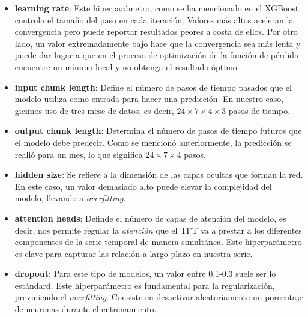 \begin{itemize}
    \item \textbf{learning rate}: Este hiperparámetro, como se ha mencionado en el XGBoost, controla el tamaño del paso en cada iteración. Valores más altos aceleran la convergencia pero puede reportar resultados peores a costa de ellos. Por otro lado, un valor extremadamente bajo hace que la convergencia sea más lenta y puede dar lugar a que en el proceso de optimización de la función de pérdida encuentre un mínimo local y no obtenga el resultado óptimo.
    
    \item \textbf{input chunk length}: Define el número de pasos de tiempo pasados que el modelo utiliza como entrada para hacer una predicción. En nuestro caso, gicimos uso de tres mese de datos, es decir, $24 \times 7 \times 4 \times 3$ pasos de tiempo.
    \item \textbf{output chunk length}: Determina el número de pasos de tiempo futuros que el modelo debe predecir. Como se mencionó anteriormente, la predicción se realió para un mes, lo que significa $24 \times 7 \times 4$ pasos.
     
    \item \textbf{hidden size}: Se refiere a la dimensión de las capas ocultas que forman la red. En este caso, un valor demasiado alto puede elevar la complejidad del modelo, llevando a \textit{overfitting}.
     
    \item \textbf{attention heads}: Definde el número de capas de atención del modelo, es decir, nos permite regular la \textit{atención} que el TFT va a prestar a los diferentes componentes de la serie temporal de manera simultánea. Este hiperparámetro es clave para capturar las relación a largo plazo en nuestra serie.
     
    \item \textbf{dropout}: Para este tipo de modelos, un valor entre 0.1-0.3 suele ser lo estándard. Este hiperparámetro es fundamental para la regularización, previniendo el \textit{overfitting}. Consiste en desactivar aleatoriamente un porcentaje de neuronas durante el entrenamiento.
\end{itemize}

